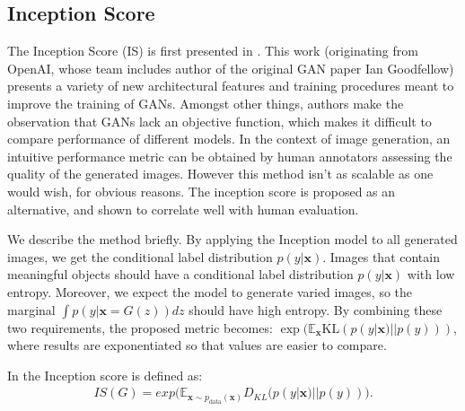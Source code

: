 \subsection{Inception Score}
The Inception Score (IS) is first presented in \cite{salimans2016improved}. This work (originating from OpenAI, whose team includes author of the original GAN paper Ian Goodfellow) presents a variety of new architectural features and training procedures meant to improve the training of GANs. Amongst other things, authors make the observation that GANs lack an objective function, which makes it difficult to compare performance of different models. In the context of image generation, an intuitive performance metric can be obtained by human annotators assessing the quality of the generated images. However this method isn't as scalable as one would wish, for obvious reasons. The inception score is proposed as an alternative, and shown to correlate well with human evaluation. 

We describe the method briefly. By applying the Inception model \cite{inceptionv2} to all generated images, we get the conditional label distribution $p(y|\bm{x})$. Images that contain meaningful objects should have a conditional label distribution $p(y|\bm{x})$ with low entropy. Moreover, we expect the model to generate varied images, so the marginal $\int p(y|\bm{x} = G(z))dz$ should have high entropy. By combining these two requirements, the proposed metric becomes: $\exp( \mathbb{E}_{\bm{x}} \text{KL} (p(y|\bm{x})||p(y)))$, where results are exponentiated so that values are easier to compare.


In \cite{Barrat2018IS} the Inception score is defined  as:
\begin{equation}
\label{eq_IS}
\begin{split}
IS(G) = exp\big(\mathbb{E}_{\bm{x} \sim p_{\text{data}}(\bm{x})}D_{KL}(p(y|\bm{x})||p(y))\big).
\end{split}
\end{equation}

